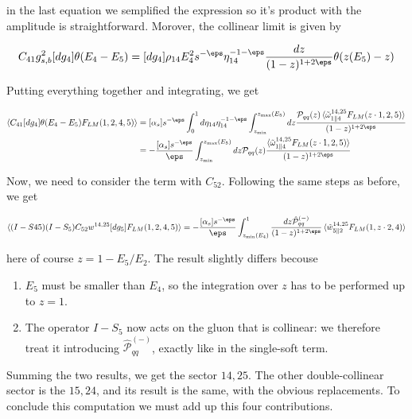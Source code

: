 \documentclass[11pt]{report}
\begin{document}
in the last equation we semplified the expression so it's product with the amplitude is straightforward. Morover, the collinear limit is given by 

\begin{align}
    C_{41}g^2_{s, b} [dg_4]\theta(E_4-E_5) = [dg_4]\rho_{14}E_4^2 s^{-\eps} \eta_{14}^{-1-\eps}\frac{dz}{(1-z)^{1+2\eps}} \theta(z(E_5) -z)
\end{align}

Putting everything together and integrating, we get 

\begin{align}
    \braket{C_{41} [dg_4]\theta(E_4-E_5)F_{LM}(1, 2,4, 5)} &= [\alpha_s] s^{-\eps} \int_0^1 d\eta_{14}\eta_{14}^{-1-\eps}\int_{z_{\min}}^{z_{\max}(E_5)} dz \frac{\mathcal{P}_{qq}(z)\braket{\tilde{\omega}^{14, 25}_{1 \parallel 4}F_{LM}(z\cdot 1, 2, 5)}}{(1-z)^{1+2\eps}} \notag \\ 
    &= -\frac{[\alpha_s] s^{-\eps}}{\eps}\int_{z_{\min}}^{z_{\max}(E_5)} dz \mathcal{P}_{qq}(z)\frac{\braket{\tilde{\omega}^{14, 25}_{1 \parallel 4}F_{LM}(z\cdot 1, 2, 5)}}{(1-z)^{1+2\eps}}
\end{align}

Now, we need to consider the term with \(C_{52}\). Following the same steps as before, we get 

\begin{align}
    \braket{(I-S{45})(I-S_5)C_{52}w^{14, 25}[dg_5]F_{LM}(1, 2, 4, 5)} = -\frac{[\alpha_s]s^{-\eps}}{\eps}\int_{z_{\min}(E_4)}^1 \frac{dz\hat{\mathcal{P}}^{(-)}_{qq}}{(1-z)^{1+2\eps}} \braket{\tilde{w}^{14, 25}_{5\parallel 2}F_{LM}(1, z\cdot 2, 4)}
\end{align}

here of course \(z = 1-E_5/E_2\). The result slightly differs becouse 

\begin{enumerate}
    \item \(E_5\) must be smaller than \(E_4\), so the integration over \(z\) has to be performed up to \(z=1\). 
    \item The operator \(I-S_5\) now acts on the gluon that is collinear: we therefore treat it introducing \(\hat{\mathcal{P}}^{(-)}_{qq}\), exactly like in the single-soft term. 
\end{enumerate}

Summing the two results, we get the sector \(14, 25\). The other double-collinear sector is the \(15, 24\), and its result is the same, with the obvious replacements. To conclude this computation we must add up this four contributions. 
\end{document}
